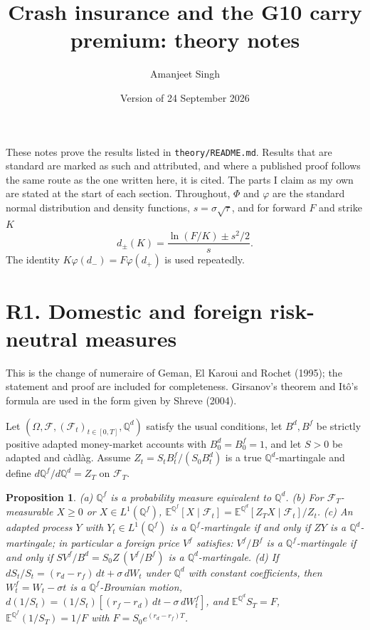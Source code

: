 \documentclass[11pt]{article}
\title{Crash insurance and the G10 carry premium: theory notes}
\author{Amanjeet Singh}
\date{Version of 24 September 2026}
\newtheorem{proposition}{Proposition}
\theoremstyle{remark}
\newcommand{\E}{\mathbb{E}}
\newcommand{\Q}{\mathbb{Q}}
\begin{document}
\maketitle

\noindent These notes prove the results listed in \texttt{theory/README.md}. Results that are standard are marked as such and attributed, and where a published proof follows the same route as the one written here, it is cited. The parts I claim as my own are stated at the start of each section. Throughout, $\Phi$ and $\varphi$ are the standard normal distribution and density functions, $s=\sigma\sqrt{\tau}$, and for forward $F$ and strike $K$
\[
d_\pm(K)=\frac{\ln(F/K)\pm s^2/2}{s}.
\]
The identity $K\varphi(d_-)=F\varphi(d_+)$ is used repeatedly.

\section*{R1. Domestic and foreign risk-neutral measures}

This is the change of numeraire of Geman, El Karoui and Rochet (1995); the statement and proof are included for completeness. Girsanov's theorem and It\^o's formula are used in the form given by Shreve (2004).

Let $(\Omega,\mathcal F,(\mathcal F_t)_{t\in[0,T]},\Q^d)$ satisfy the usual conditions, let $B^d,B^f$ be strictly positive adapted money-market accounts with $B^d_0=B^f_0=1$, and let $S>0$ be adapted and c\`adl\`ag. Assume $Z_t=S_tB^f_t/(S_0B^d_t)$ is a true $\Q^d$-martingale and define $d\Q^f/d\Q^d=Z_T$ on $\mathcal F_T$.

\begin{proposition}
(a) $\Q^f$ is a probability measure equivalent to $\Q^d$. (b) For $\mathcal F_T$-measurable $X\ge0$ or $X\in L^1(\Q^f)$, $\E^{\Q^f}[X\mid\mathcal F_t]=\E^{\Q^d}[Z_TX\mid\mathcal F_t]/Z_t$. (c) An adapted process $Y$ with $Y_t\in L^1(\Q^f)$ is a $\Q^f$-martingale if and only if $ZY$ is a $\Q^d$-martingale; in particular a foreign price $V^f$ satisfies: $V^f/B^f$ is a $\Q^f$-martingale if and only if $SV^f/B^d=S_0Z\,(V^f/B^f)$ is a $\Q^d$-martingale. (d) If $dS_t/S_t=(r_d-r_f)\,dt+\sigma\,dW_t$ under $\Q^d$ with constant coefficients, then $W^f_t=W_t-\sigma t$ is a $\Q^f$-Brownian motion, $d(1/S_t)=(1/S_t)[(r_f-r_d)\,dt-\sigma\,dW^f_t]$, and $\E^{\Q^d}S_T=F$, $\E^{\Q^f}(1/S_T)=1/F$ with $F=S_0e^{(r_d-r_f)T}$.
\end{proposition}
\end{document}
